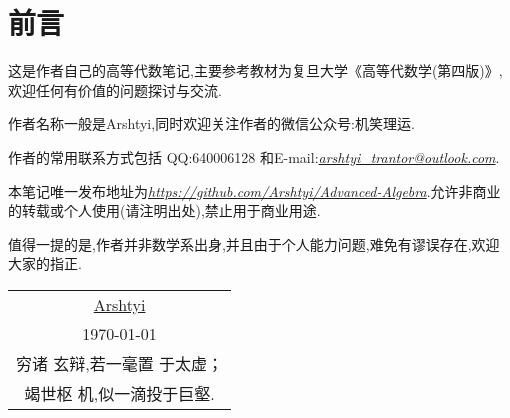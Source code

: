 \newpage
\section*{前言}
\thispagestyle{empty}
这是作者自己的高等代数笔记,主要参考教材为复旦大学《高等代数学(第四版)》,欢迎任何有价值的问题探讨与交流.

作者名称一般是Arshtyi,同时欢迎关注作者的微信公众号:机笑理运.

作者的常用联系方式包括 QQ:640006128 和E-mail:\textit{\url{arshtyi_trantor@outlook.com}}.

本笔记唯一发布地址为\textit{\url{https://github.com/Arshtyi/Advanced-Algebra}}.允许非商业的转载或个人使用(请注明出处),禁止用于商业用途.

值得一提的是,作者并非数学系出身,并且由于个人能力问题,难免有谬误存在,欢迎大家的指正.
\begin{flushright}
    \begin{tabular}{c}
        \href{https://github.com/Arshtyi}{Arshtyi} \\
        \today                                     \\ 穷诸
        玄辩,若一毫置
        于太虚；                                       \\ 竭世枢
        机,似一滴投于巨壑.
    \end{tabular}
\end{flushright}
\thispagestyle{empty}